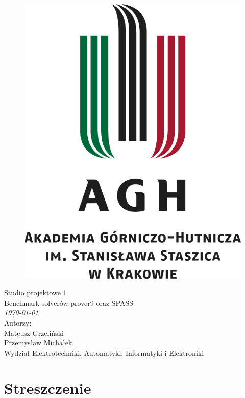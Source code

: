 \documentclass[a4paper,12pt]{article}
\begin{document}
\onehalfspacing
\begin{figure}[!htb]
  \centerline{\includegraphics[scale=0.8]{images/agh_logo.jpg}}
\end{figure}

\begin{center}
  \Huge{Studio projektowe 1\\}
  \Large{Benchmark solverów prover9 oraz SPASS\\ \large \textit \today \\}
  \vspace{3cm}
  \Large{	Autorzy:\\
    Mateusz Grzeliński\\
    Przemysław Michałek\\
  }
  \large{Wydział Elektrotechniki, Automatyki, Informatyki i Elektroniki}

  \newpage
\end{center}

\tableofcontents
\newpage

\section{Streszczenie}
\end{document}
